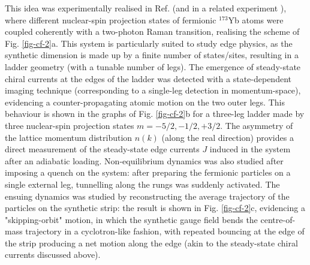 \documentclass[epj,final]{svjour}
\begin{document}
This idea was experimentally realised in Ref. \cite{mancini2015observation} (and in a related experiment \cite{stuhl2015visualizingedge}), where different nuclear-spin projection states of fermionic $^{173}$Yb atoms were coupled coherently with a two-photon Raman transition, realising the scheme of Fig. \ref{fig-cf-2}a. This system is particularly suited to study edge physics, as the synthetic dimension is made up by a finite number of states/sites, resulting in a ladder geometry (with a tunable number of legs). The emergence of steady-state chiral currents at the edges of the ladder was detected with a state-dependent imaging technique (corresponding to a single-leg detection in momentum-space), evidencing a counter-propagating atomic motion on the two outer legs. This behaviour is shown in the  graphs of Fig. \ref{fig-cf-2}b for a three-leg ladder made by three nuclear-spin projection states $m=-5/2, -1/2, +3/2$. The asymmetry of the lattice momentum distribution $n(k)$ (along the real direction) provides a direct measurement of the steady-state edge currents $J$ induced in the system after an adiabatic loading. Non-equilibrium dynamics was also studied after imposing a quench on the system: after preparing the fermionic particles on a single external leg, tunnelling along the rungs was suddenly activated. The ensuing dynamics was studied by reconstructing the average trajectory of the particles on the synthetic strip: the result is shown in Fig. \ref{fig-cf-2}c, evidencing a "skipping-orbit" motion, in which the synthetic gauge field bends the centre-of-mass trajectory in a cyclotron-like fashion, with repeated bouncing at the edge of the strip producing a net motion along the edge (akin to the steady-state chiral currents discussed above).
\end{document}
